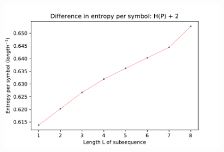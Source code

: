 \documentclass[a4paper]{article}
\begin{document}
\begin{enumerate}[label=(\alph*)]
\begin{figure}
    \end{figure}
    \begin{figure}
        \includegraphics{entropy.pdf}
    \end{figure}
\end{enumerate}
\end{document}
